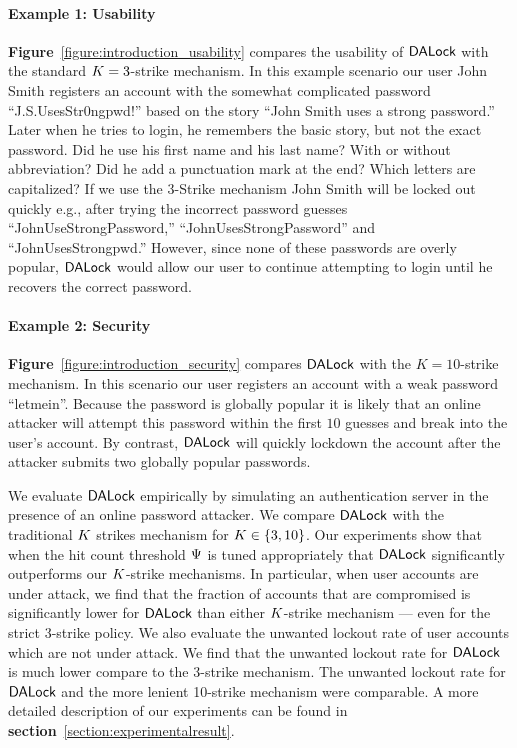 \paragraph{Example 1: Usability} \textbf{Figure}~\ref{figure:introduction_usability} compares the usability of $\mathsf{DALock}$ with the standard $K=3$-strike mechanism. In this example scenario our user John Smith registers an account with the somewhat complicated password ``J.S.UsesStr0ngpwd!'' based on the story ``John Smith uses a strong password.'' Later when he tries to login, he remembers the basic story, but not the exact password. Did he use his first name and his last name? With or without abbreviation? Did he add a punctuation mark at the end? Which letters are capitalized? If we use the 3-Strike mechanism John Smith will be locked out quickly e.g., after trying the incorrect password guesses ``JohnUseStrongPassword,'' ``JohnUsesStrongPassword'' and ``JohnUsesStrongpwd.'' However, since none of these passwords are overly popular, $\mathsf{DALock}$ would allow our user to continue attempting to login until he recovers the correct password. 

\paragraph{Example 2: Security} \textbf{Figure}~\ref{figure:introduction_security} compares $\mathsf{DALock}$ with the $K=10$-strike mechanism. In this scenario our user registers an account with a weak password ``letmein''. Because the password is globally popular it is likely that an online attacker will attempt this password within the first $10$ guesses and break into the user's account. By contrast, $\mathsf{DALock}$ will quickly lockdown the account after the attacker submits two globally popular passwords. 

We evaluate $\mathsf{DALock}$ empirically by simulating an authentication server in the presence of an online password attacker. We compare $\mathsf{DALock}$ with the traditional $K$ strikes mechanism for $K \in \{3,10\}$. Our experiments show that when the hit count threshold $\Psi$ is tuned appropriately that $\mathsf{DALock}$ significantly outperforms our $K$-strike mechanisms. In particular, when user accounts are under attack, we find that the fraction of accounts that are compromised is significantly lower for $\mathsf{DALock}$ than either $K$-strike mechanism --- even for the strict 3-strike policy. We also evaluate the unwanted lockout rate of user accounts which are not under attack. We find that the unwanted lockout rate for $\mathsf{DALock}$ is much lower compare to the 3-strike mechanism. The unwanted lockout rate for $\mathsf{DALock}$ and the more lenient 10-strike mechanism were comparable. A more detailed description of our experiments can be found in \textbf{section}~\ref{section:experimentalresult}.

